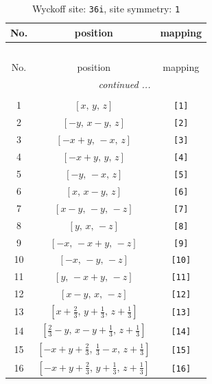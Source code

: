 \documentclass[fleqn,8pt]{jsarticle}
\begin{document}
\renewcommand{\arraystretch}{1.2}
\begin{longtable}{ccc}
\caption{Wyckoff site: {\tt 36i}, site symmetry: {\tt 1}}
 \\
 \hline \hline
No. & position & mapping \\ \hline \endfirsthead

\multicolumn{2}{l}{\tablename\ \thetable{}} \\
 \hline \hline
No. & position & mapping \\ \hline \endhead

 \hline \hline
\multicolumn{2}{r}{\footnotesize\it continued ...} \\ \endfoot

 \hline \hline
\multicolumn{2}{r}{} \\ \endlastfoot

1 & $\left[ x,\, y,\, z \right]$ & {\tt [1]} \\ \hline
2 & $\left[ - y,\, x - y,\, z \right]$ & {\tt [2]} \\ \hline
3 & $\left[ - x + y,\, - x,\, z \right]$ & {\tt [3]} \\ \hline
4 & $\left[ - x + y,\, y,\, z \right]$ & {\tt [4]} \\ \hline
5 & $\left[ - y,\, - x,\, z \right]$ & {\tt [5]} \\ \hline
6 & $\left[ x,\, x - y,\, z \right]$ & {\tt [6]} \\ \hline
7 & $\left[ x - y,\, - y,\, - z \right]$ & {\tt [7]} \\ \hline
8 & $\left[ y,\, x,\, - z \right]$ & {\tt [8]} \\ \hline
9 & $\left[ - x,\, - x + y,\, - z \right]$ & {\tt [9]} \\ \hline
10 & $\left[ - x,\, - y,\, - z \right]$ & {\tt [10]} \\ \hline
11 & $\left[ y,\, - x + y,\, - z \right]$ & {\tt [11]} \\ \hline
12 & $\left[ x - y,\, x,\, - z \right]$ & {\tt [12]} \\ \hline
13 & $\left[ x + \frac{2}{3},\, y + \frac{1}{3},\, z + \frac{1}{3} \right]$ & {\tt [13]} \\ \hline
14 & $\left[ \frac{2}{3} - y,\, x - y + \frac{1}{3},\, z + \frac{1}{3} \right]$ & {\tt [14]} \\ \hline
15 & $\left[ - x + y + \frac{2}{3},\, \frac{1}{3} - x,\, z + \frac{1}{3} \right]$ & {\tt [15]} \\ \hline
16 & $\left[ - x + y + \frac{2}{3},\, y + \frac{1}{3},\, z + \frac{1}{3} \right]$ & {\tt [16]} \\ \hline

\end{longtable}
\end{document}
